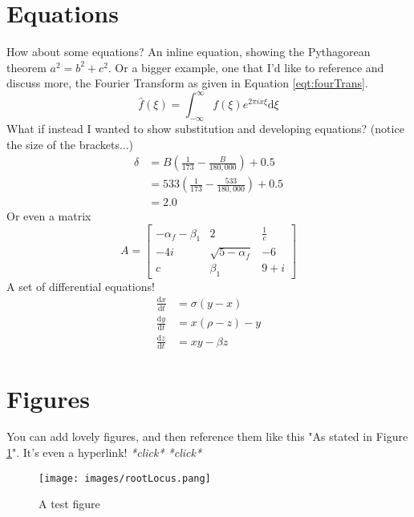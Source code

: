 \documentclass[hidelinks, 12pt]{article}%
\begin{document}
    \section{Equations}
        How about some equations? An inline equation, showing the Pythagorean theorem \(a^{2} = b^{2} + c^{2}\).
        Or a bigger example, one that I'd like to reference and discuss more, the Fourier Transform as given in Equation \ref{eqt:fourTrans}.
        \begin{equation}
            \hat{f}\left(\xi\right) = \int_{-\infty}^{\infty}f\left(\xi\right)e^{2\pi ix\xi}\text{d}\xi
            \label{eqt:fourTrans}
        \end{equation}
        What if instead I wanted to show substitution and developing equations? (notice the size of the brackets...)
        \begin{align}
            \delta & = B\left(\frac{1}{173} - \frac{B}{180,000}\right) + 0.5\nonumber      \\
                   & = 533\left(\frac{1}{173} - \frac{533}{180,000}\right) + 0.5 \nonumber \\
                   & = 2.0 \nonumber
        \end{align}
        Or even a matrix
        \begin{equation*}
            A =
            \begin{bmatrix}
                -\alpha_f-\beta_1 & 2                 & \frac{1}{c} \\
                -4i               & \sqrt{5-\alpha_f} & -6          \\
                c                 & \beta_1           & 9 + i
            \end{bmatrix}
        \end{equation*}
        A set of differential equations!
        \begin{align}
            \frac{\text{d}x}{\text{d}t} &= \sigma (y-x)\\
            \frac{\text{d}y}{\text{d}t} &= x(\rho -z)-y\\
            \frac{\text{d}z}{\text{d}t} &= xy-\beta z
        \end{align}


    \clearpage
    \section{Figures}
        You can add lovely figures, and then reference them like this "As stated in Figure \ref{fig:test}".
        It's even a hyperlink! \textit{*click* *click*}
        \begin{figure}[H]
            \begin{centering}
                \texttt{[image: images/rootLocus.pang]}
                \caption{A test figure}
                \label{fig:test}
            \end{centering}
        \end{figure}
\end{document}
